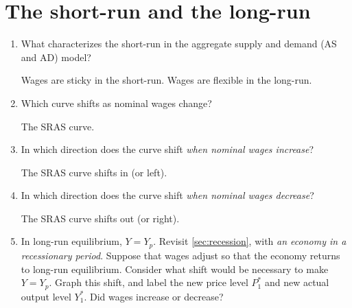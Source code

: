 \documentclass[
    letterpaper,paper=portrait,fleqn,
    DIV=16,fontsize=12pt,twoside=semi,
    parskip=full-,
    headings=standardclasses]
{scrartcl}
\begin{document}
\section{The short-run and the long-run}

\begin{enumerate}

\item What characterizes the short-run in the aggregate supply and demand (AS and AD) model?

\begin{solution}
Wages are sticky in the short-run. Wages are flexible in the long-run.
\end{solution}

\item Which curve shifts as nominal wages change?

\begin{solution}
The SRAS curve.
\end{solution}

\item In which direction does the curve shift \emph{when nominal wages increase}?

\begin{solution}
The SRAS curve shifts in (or left).
\end{solution}

\item In which direction does the curve shift \emph{when nominal wages decrease}?

\begin{solution}
The SRAS curve shifts out (or right).
\end{solution}

\item In long-run equilibrium, $Y=Y_p$. Revisit \cref{sec:recession}, with \emph{an economy in a recessionary period}. Suppose that wages adjust so that the economy returns to long-run equilibrium. Consider what shift would be necessary to make $Y=Y_p$. Graph this shift, and label the new price level $P^*_1$ and new actual output level $Y^*_1$. Did wages increase or decrease?

\begin{solution}


\end{solution}
\end{enumerate}
\end{document}

